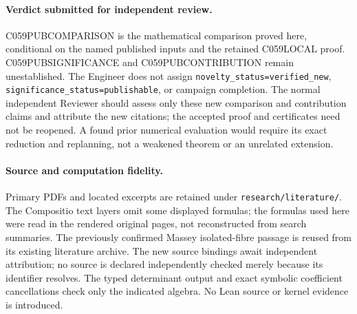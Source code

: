\documentclass[11pt]{article}
\begin{document}
\paragraph{Verdict submitted for independent review.}
C059PUBCOMPARISON is the mathematical comparison proved here,
conditional on the named published inputs and the retained
C059LOCAL proof.  C059PUBSIGNIFICANCE and
C059PUBCONTRIBUTION remain unestablished.  The Engineer
does not assign \texttt{novelty\_status=verified\_new},
\texttt{significance\_status=publishable}, or campaign completion.
The normal independent Reviewer should assess only these new
comparison and contribution claims and attribute the new
citations; the accepted proof and certificates need not be
reopened.  A found prior numerical evaluation would require
its exact reduction and replanning, not a weakened theorem or
an unrelated extension.

\paragraph{Source and computation fidelity.}
Primary PDFs and located excerpts are retained under
\texttt{research/literature/}.  The Compositio text layers omit
some displayed formulas; the formulas used here were read in
the rendered original pages, not reconstructed from search
summaries.  The previously confirmed Massey isolated-fibre
passage is reused from its existing literature archive.
The new source bindings await independent attribution; no
source is declared independently checked merely because its
identifier resolves.  The typed determinant output and exact
symbolic coefficient cancellations check only the indicated
algebra.  No Lean source or kernel evidence is introduced.
\end{document}
